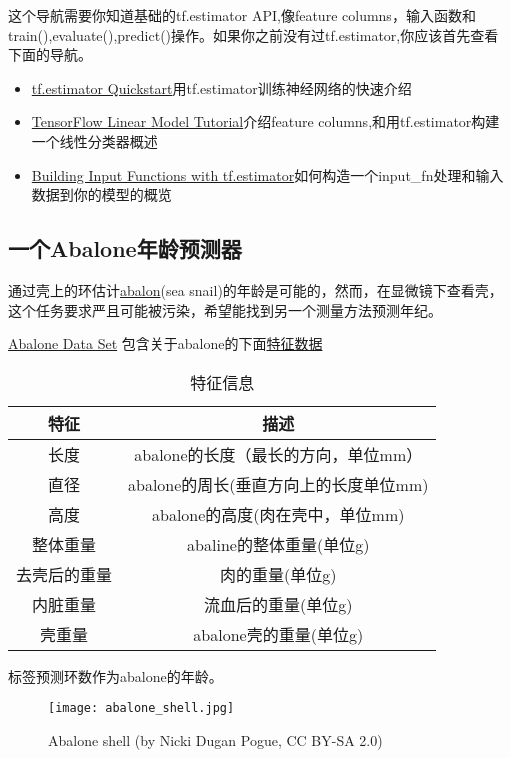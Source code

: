这个导航需要你知道基础的tf.estimator API,像feature columns，输入函数和train(),evaluate(),predict()操作。如果你之前没有过tf.estimator,你应该首先查看下面的导航。
\begin{itemize}
	\item \href{https://www.tensorflow.org/get_started/estimator}{tf.estimator Quickstart}用tf.estimator训练神经网络的快速介绍
	\item \href{https://www.tensorflow.org/tutorials/wide}{TensorFlow Linear Model Tutorial}介绍feature columns,和用tf.estimator构建一个线性分类器概述
	\item \href{https://www.tensorflow.org/get_started/input_fn}{Building Input Functions with tf.estimator}如何构造一个input\_fn处理和输入数据到你的模型的概览
\end{itemize}
\subsection{一个Abalone年龄预测器}
通过壳上的环估计\href{https://en.wikipedia.org/wiki/Abalone}{abalon}(sea snail)的年龄是可能的，然而，在显微镜下查看壳，这个任务要求严且可能被污染，希望能找到另一个测量方法预测年纪。

\href{https://archive.ics.uci.edu/ml/datasets/Abalone}{Abalone Data Set} 包含关于abalone的下面\href{https://archive.ics.uci.edu/ml/machine-learning-databases/abalone/abalone.names}{特征数据}

\begin{table}[!h]
\centering 
\begin{tabular}{|c|c|}
		\hline
特征&描述\\
		\hline
长度&abalone的长度（最长的方向，单位mm）\\
		\hline
直径&abalone的周长(垂直方向上的长度单位mm)\\
		\hline
高度&abalone的高度(肉在壳中，单位mm)\\
		\hline
整体重量&abaline的整体重量(单位g)\\
		\hline
去壳后的重量&肉的重量(单位g)\\
		\hline
内脏重量&流血后的重量(单位g)\\
		\hline
壳重量&abalone壳的重量(单位g)\\
		\hline
\end{tabular}
\caption{特征信息}
\end{table}
标签预测环数作为abalone的年龄。
\begin{figure}[H]
	\centering
	\texttt{[image: abalone\_shell.jpg]}
	\caption{Abalone shell (by Nicki Dugan Pogue, CC BY-SA 2.0)}
\end{figure}
